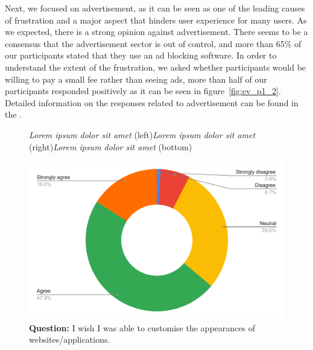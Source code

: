 Next, we focused on advertisement, as it can be seen as one of the leading causes of frustration and a major aspect that hinders user experience for many users. As we expected, there is a strong opinion against advertisement. There seems to be a consensus that the advertisement sector is out of control, and more than 65\% of our participants stated that they use an ad blocking software. In order to understand the extent of the frustration, we asked whether participants would be willing to pay a small fee rather than seeing ads, more than half of our participants responded positively as it can be seen in figure~\ref{fig:ev_p1_2}. Detailed information on the responses related to advertisement can be found in the .


\begin{figure}[H]
\centering
{}
\vspace*{-5mm}
\caption{\newline\textit{Lorem ipsum dolor sit amet} (left)\newline\textit{Lorem ipsum dolor sit amet} (right)\newline\textit{Lorem ipsum dolor sit amet} (bottom)} \label{fig:ev_p1_test}
\end{figure}



\begin{figure}[H]
  \centering
  \includegraphics[width=13cm]{thesis/paper/images/p1_q8.pdf}
  \textbf{Question:} I wish I was able to customise the appearances of websites/applications.
\end{figure}

